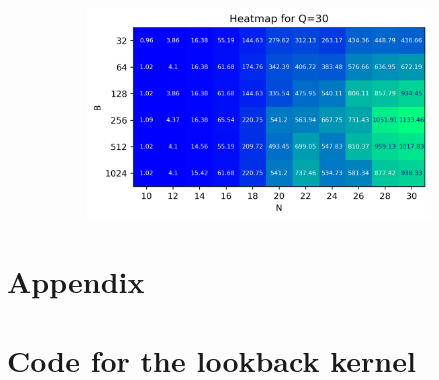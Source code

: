\documentclass[twocolumn]{article}
\begin{document}
\begin{figure}
    \centering
    \begin{subfigure}{0.47\linewidth}
        \includegraphics[width=\linewidth]{report/plots/heatmap_BvN_Q=30.png}
    \end{subfigure}
\end{figure}

\onecolumn

\newpage

\section{Appendix}

\appendix

\section{Code for the lookback kernel}
\end{document}
